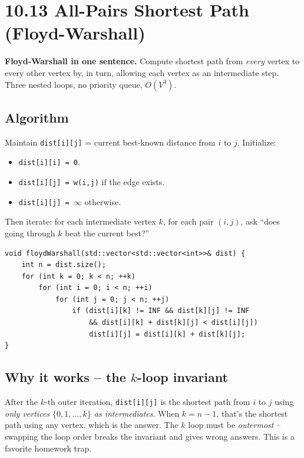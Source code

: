 \documentclass[11pt]{article}
\begin{document}
\section{10.13 All-Pairs Shortest Path (Floyd-Warshall)}

\begin{ideabox}
\textbf{Floyd-Warshall in one sentence.} Compute shortest path from \emph{every} vertex to every other vertex by, in turn, allowing each vertex as an intermediate step. Three nested loops, no priority queue, $O(V^3)$.
\end{ideabox}

\subsection*{Algorithm}

Maintain \texttt{dist[i][j]} = current best-known distance from $i$ to $j$. Initialize:
\begin{itemize}[leftmargin=*]
    \item \texttt{dist[i][i] = 0}.
    \item \texttt{dist[i][j] = w(i,j)} if the edge exists.
    \item \texttt{dist[i][j] = $\infty$} otherwise.
\end{itemize}

Then iterate: for each intermediate vertex $k$, for each pair $(i, j)$, ask ``does going through $k$ beat the current best?''

\begin{lstlisting}[basicstyle=\ttfamily\small,frame=single]
void floydWarshall(std::vector<std::vector<int>>& dist) {
    int n = dist.size();
    for (int k = 0; k < n; ++k)
        for (int i = 0; i < n; ++i)
            for (int j = 0; j < n; ++j)
                if (dist[i][k] != INF && dist[k][j] != INF
                    && dist[i][k] + dist[k][j] < dist[i][j])
                    dist[i][j] = dist[i][k] + dist[k][j];
}
\end{lstlisting}

\subsection*{Why it works -- the $k$-loop invariant}

\begin{ideabox}
After the $k$-th outer iteration, \texttt{dist[i][j]} is the shortest path from $i$ to $j$ using \emph{only vertices $\{0, 1, \ldots, k\}$ as intermediates}. When $k = n-1$, that's the shortest path using any vertex, which is the answer. The $k$ loop must be \emph{outermost} -- swapping the loop order breaks the invariant and gives wrong answers. This is a favorite homework trap.
\end{ideabox}
\end{document}

